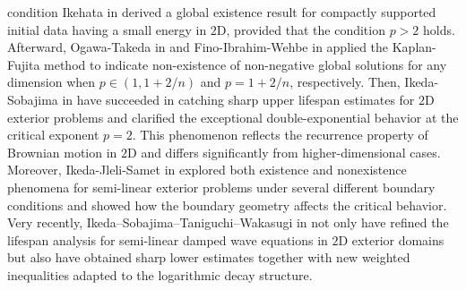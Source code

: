 \documentclass[a4paper,11pt]{article} %
\theoremstyle{remark}
\theoremstyle{definition}
\numberwithin{equation}{section}
\begin{document}
condition Ikehata in \cite{Ikehata2005} derived a global existence result for compactly supported initial data having a small energy in $2$D, provided that the condition $p>2$ holds. Afterward, Ogawa-Takeda in \cite{OgawaTakeda2009} and Fino-Ibrahim-Wehbe in \cite{Fino2017} applied the Kaplan-Fujita method to indicate non-existence of non-negative global solutions for any dimension when $p\in (1,1+2/n)$ and $p=1+2/n$, respectively. Then, Ikeda-Sobajima in \cite{IkedaSobajima2019-1} have succeeded in catching sharp upper lifespan estimates for $2$D exterior problems and clarified the exceptional double-exponential behavior at the critical exponent $p=2$. This phenomenon reflects the recurrence property of Brownian motion in $2$D and differs significantly from higher-dimensional cases. Moreover, Ikeda-Jleli-Samet in \cite{IkedaJleliSamet2020} explored both existence and nonexistence phenomena for semi-linear exterior problems under several different boundary conditions and showed how the boundary geometry affects the critical behavior. Very recently, Ikeda–Sobajima–Taniguchi–Wakasugi in \cite{IkedaSobajimaTaniguchiWakasugi2024} not only have refined the lifespan analysis for semi-linear damped wave equations in $2$D exterior domains but also have obtained sharp lower estimates together with new weighted inequalities adapted to the logarithmic decay structure.
\end{document}
